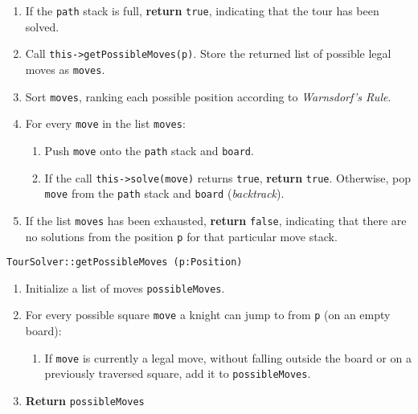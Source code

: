 \begin{enumerate}
	\item	If the {\tt path} stack is full, {\bf return} {\tt true}, indicating that the tour has been solved.
	\item	Call {\tt this->getPossibleMoves(p)}. Store the returned list of possible legal moves as {\tt moves}.
	\item	Sort {\tt moves}, ranking each possible position according to {\em Warnsdorf's Rule}.
	\item	For every {\tt move} in the list {\tt moves}:
	\begin{enumerate}
		\item	Push {\tt move} onto the {\tt path} stack and {\tt board}.
		\item	If the call {\tt this->solve(move)} returns {\tt true}, {\bf return} {\tt true}.
				Otherwise, pop {\tt move} from the {\tt path} stack and {\tt board} ({\em backtrack}).
	\end{enumerate}
	\item	If the list {\tt moves} has been exhausted, {\bf return} {\tt false}, indicating that
			there are no solutions from the position {\tt p} for that particular move stack.
\end{enumerate}
\vspace{5mm}
{\tt TourSolver::getPossibleMoves (p:Position)}
\begin{enumerate}
	\item	Initialize a list of moves {\tt possibleMoves}.
	\item	For every possible square {\tt move} a knight can jump to from {\tt p} (on an empty board):
	\begin{enumerate}
		\item	If {\tt move} is currently a legal move, without falling outside the board or on a previously
				traversed square, add it to {\tt possibleMoves}.
	\end{enumerate}
	\item	{\bf Return} {\tt possibleMoves}
\end{enumerate}

\clearpage
\sourcecode

\clearpage



